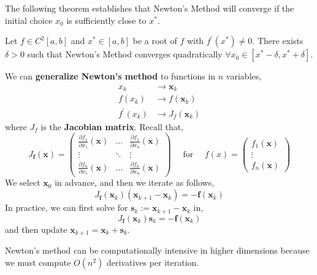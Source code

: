 \noindent The following theorem establishes that Newton's Method will converge if the initial choice $x_0$ is sufficiently close to $x^*$.

\begin{thm}
   Let $f \in C^2{[a,b]}$ and $x^* \in [a, b]$ be a root of $f$ with $f^{\prime}(x^*) \neq 0$. There exists $\delta > 0$ such that Newton's Method converges quadratically $\forall x_0 \in\left[x^*-\delta, x^*+\delta\right]$.
\end{thm}

\noindent We can \textbf{generalize Newton's method} to functions in $n$ variables,
\begin{align*}
x_k &\rightarrow \mathbf{x}_k \\
f\left(x_k\right) &\rightarrow f\left(\mathbf{x}_k\right) \\
f^{\prime}\left(x_k\right) &\rightarrow J_f\left(\mathbf{x}_k\right)
\end{align*}
where $J_f$ is the \textbf{Jacobian matrix}. Recall that,
\[J_{\mathbf{f}}(\mathbf{x})=\left(\begin{array}{ccc}
\frac{\partial f_1}{\partial x_1}(\mathbf{x}) & \ldots & \frac{\partial f_1}{\partial x_n}(\mathbf{x}) \\
\vdots & \ddots & \vdots \\
\frac{\partial f_n}{\partial x_1}(\mathbf{x}) & \ldots & \frac{\partial f_n}{\partial x_n}(\mathbf{x})
\end{array}\right) \quad \text{ for } \quad f(x)=\left(\begin{array}{c}
f_1(\mathbf{x}) \\
\vdots \\
f_n(\mathbf{x})
\end{array}\right)\]
\noindent We select $\mathbf{x}_0$ in advance, and then we iterate as follows,
\[J_{\mathbf{f}}\left(\mathbf{x}_k\right)\left(\mathbf{x}_{k+1}-\mathbf{x}_k\right)=-\mathbf{f}\left(\mathbf{x}_k\right)\]
In practice, we can first solve for $\mathbf{s}_k:=\mathbf{x}_{k+1}-\mathbf{x}_k$ in,
\[J_{\mathbf{f}}\left(\mathbf{x}_k\right) \mathbf{s}_k=-\mathbf{f}\left(\mathbf{x}_k\right)\]
and then update $\mathbf{x}_{k+1}=\mathbf{x}_k+\mathbf{s}_k$.
\begin{marginfigure}
    Newton's method can be computationally intensive in higher dimensions because we must compute $O(n^2)$ derivatives per iteration.
\end{marginfigure}